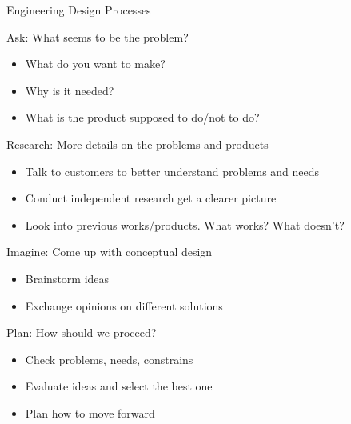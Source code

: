 \documentclass[10pt, svgnames]{beamer}
\begin{document}
\begin{frame}[label={sec:orgdcb13cd}]{Engineering Design Processes}
\begin{center}
\end{center}
\end{frame}

\begin{frame}[label={sec:orgc5c3a14}]{Ask: What seems to be the problem?}
\begin{itemize}
\item What do you want to make?
\item Why is it needed?
\item What is the product supposed to do/not to do?
\end{itemize}
\end{frame}

\begin{frame}[label={sec:orgc8a640c}]{Research: More details on the problems and products}
\begin{itemize}
\item Talk to customers to better understand problems and needs
\item Conduct independent research get a clearer picture
\item Look into previous works/products. What works? What doesn't?
\end{itemize}
\end{frame}

\begin{frame}[label={sec:org94dfeab}]{Imagine: Come up with conceptual design}
\begin{itemize}
\item Brainstorm ideas
\item Exchange opinions on different solutions
\end{itemize}
\end{frame}

\begin{frame}[label={sec:org484b076}]{Plan: How should we proceed?}
\begin{itemize}
\item Check problems, needs, constrains
\item Evaluate ideas and select the best one
\item Plan how to move forward
\end{itemize}
\end{frame}
\end{document}
